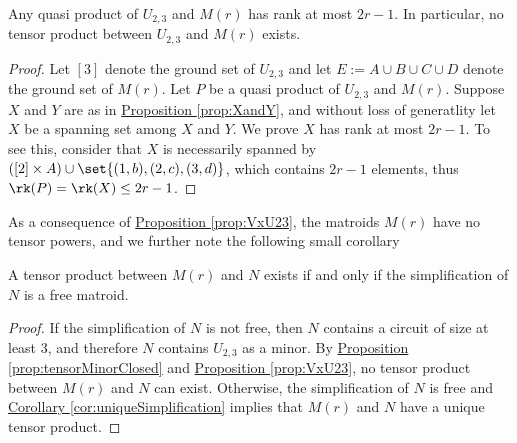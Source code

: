     \begin{proposition}\label{prop:VxU23}
    Any quasi product of $U_{2,3}$ and $M(r)$ has rank at most $2r-1$. In particular, no tensor product between $U_{2,3}$ and $M(r)$ exists.
    \end{proposition}
    \begin{proof}
        Let $[3]$ denote the ground set of $U_{2,3}$ and let $E:=A\cup B\cup C\cup D$ denote the ground set of $M(r)$. Let $P$ be a quasi product of $U_{2,3}$ and $M(r)$. Suppose $X$ and $Y$ are as in \hyperref[prop:XandY]{Proposition \ref*{prop:XandY}}, and without loss of generatlity let $X$ be a spanning set among $X$ and $Y$. We prove $X$ has rank at most $2r-1$. To see this, consider that $X$ is necessarily spanned by $([2]\times A)\cup \set{(1,b), (2,c), (3,d)}$, which contains $2r-1$ elements, thus $\rk(P)=\rk(X)\leq 2r-1$.
    \end{proof}
    
    As a consequence of \hyperref[prop:VxU23]{Proposition \ref*{prop:VxU23}}, the matroids $M(r)$ have no tensor powers, and we further note the following small corollary
    
    \begin{corollary}\label{cor:VxU23}
    A tensor product between $M(r)$ and $N$ exists if and only if the simplification of $N$ is a free matroid.
    \end{corollary}
    \begin{proof}
    If the simplification of $N$ is not free, then $N$ contains a circuit of size at least 3, and therefore $N$ contains $U_{2,3}$ as a minor. By \hyperref[prop:tensorMinorClosed]{Proposition \ref*{prop:tensorMinorClosed}} and \hyperref[prop:VxU23]{Proposition \ref*{prop:VxU23}}, no tensor product between $M(r)$ and $N$ can exist. Otherwise, the simplification of $N$ is free and \hyperref[cor:uniqueSimplification]{Corollary \ref*{cor:uniqueSimplification}} implies that $M(r)$ and $N$ have a unique tensor product.
    \end{proof}
    
